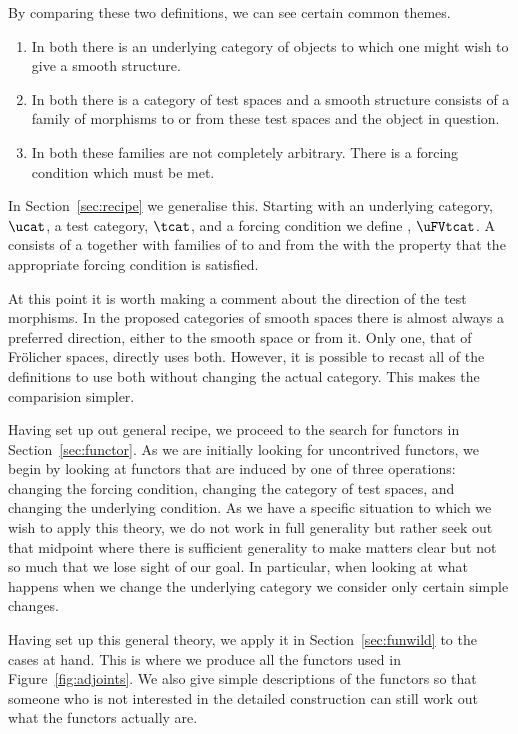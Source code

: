 \documentclass[%
a4paper,%
arxiv,%
defaults
]{myclass}
\begin{document}
By comparing these two definitions, we can see certain common themes.

\begin{enumerate}
\item In both there is an underlying category of objects to which one might wish to give a smooth structure.

\item In both there is a category of test spaces and a smooth structure consists of a family of morphisms to or from these test spaces and the object in question.

\item In both these families are not completely arbitrary.
There is a forcing condition which must be met.
\end{enumerate}

In Section~\ref{sec:recipe} we generalise this.
Starting with an underlying category, \(\ucat\), a test category, \(\tcat\), and a forcing condition we define \uFVtcat, \(\uFVtcat\).
A \uFVtobj consists of a \uobj together with families of \umors to and from the \tobjs with the property that the appropriate forcing condition is satisfied.

At this point it is worth making a comment about the direction of the test morphisms.
In the proposed categories of smooth spaces there is almost always a preferred direction, either to the smooth space or from it.
Only one, that of Fr\"olicher spaces, directly uses both.
However, it is possible to recast all of the definitions to use both without changing the actual category.
This makes the comparision simpler.

\medskip

Having set up out general recipe, we proceed to the search for functors in Section~\ref{sec:functor}.
As we are initially looking for uncontrived functors, we begin by looking at functors that are induced by one of three operations: changing the forcing condition, changing the category of test spaces, and changing the underlying condition.
As we have a specific situation to which we wish to apply this theory, we do not work in full generality but rather seek out that midpoint where there is sufficient generality to make matters clear but not so much that we lose sight of our goal.
In particular, when looking at what happens when we change the underlying category we consider only certain simple changes.

Having set up this general theory, we apply it in Section~\ref{sec:funwild} to the cases at hand.
This is where we produce all the functors used in Figure~\ref{fig:adjoints}.
We also give simple descriptions of the functors so that someone who is not interested in the detailed construction can still work out what the functors actually are.
\end{document}
